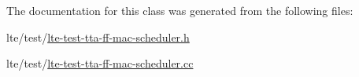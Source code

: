 The documentation for this class was generated from the following files\+:\begin{DoxyCompactItemize}
\item 
lte/test/\hyperlink{lte-test-tta-ff-mac-scheduler_8h}{lte-\/test-\/tta-\/ff-\/mac-\/scheduler.\+h}\item 
lte/test/\hyperlink{lte-test-tta-ff-mac-scheduler_8cc}{lte-\/test-\/tta-\/ff-\/mac-\/scheduler.\+cc}\end{DoxyCompactItemize}
